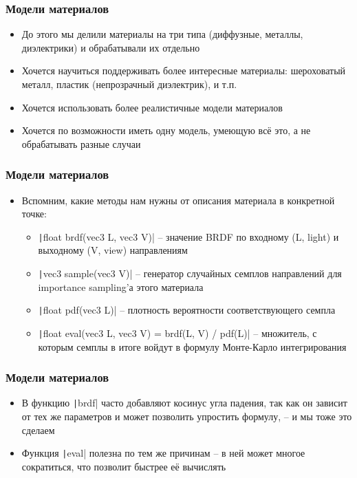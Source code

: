 \documentclass[10pt]{beamer}
\begin{document}
\begin{frame}
\frametitle{Модели материалов}
\begin{itemize}
\item До этого мы делили материалы на три типа (диффузные, металлы, диэлектрики) и обрабатывали их отдельно
\pause
\item Хочется научиться поддерживать более интересные материалы: шероховатый металл, пластик (непрозрачный диэлектрик), и т.п.
\pause
\item Хочется использовать более реалистичные модели материалов
\pause
\item Хочется по возможности иметь одну модель, умеющую всё это, а не обрабатывать разные случаи
\end{itemize}
\end{frame}

\begin{frame}
\frametitle{Модели материалов}
\begin{itemize}
\item Вспомним, какие методы нам нужны от описания материала в конкретной точке:
\pause
\begin{itemize}
\item \texttt|float brdf(vec3 L, vec3 V)| -- значение BRDF по входному (L, light) и выходному (V, view) направлениям
\pause
\item \texttt|vec3 sample(vec3 V)| -- генератор случайных семплов направлений для importance sampling'а этого материала
\pause
\item \texttt|float pdf(vec3 L)| -- плотность вероятности соответствующего семпла
\pause
\item \texttt|float eval(vec3 L, vec3 V) = brdf(L, V) / pdf(L)| -- множитель, с которым семплы в итоге войдут в формулу Монте-Карло интегрирования
\end{itemize}
\end{itemize}
\end{frame}

\begin{frame}
\frametitle{Модели материалов}
\begin{itemize}
\item В функцию \texttt|brdf| часто добавляют косинус угла падения, так как он зависит от тех же параметров и может позволить упростить формулу, -- и мы тоже это сделаем
\pause
\item Функция \texttt|eval| полезна по тем же причинам -- в ней может многое сократиться, что позволит быстрее её вычислять
\end{itemize}
\end{frame}
\end{document}
